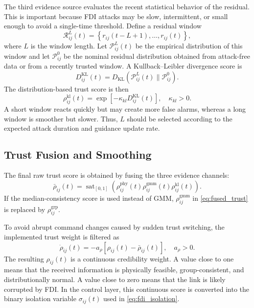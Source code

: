 \documentclass[lettersize,journal]{IEEEtran}
\newcommand{\sat}{\operatorname{sat}}
\begin{document}
The third evidence source evaluates the recent statistical behavior of the residual. This is important because FDI attacks may be slow, intermittent, or small enough to avoid a single-time threshold. Define a residual window
\begin{equation}
    \mathcal{R}_{ij}^{L}(t)
    =
    \left\{
    r_{ij}(t-L+1),\ldots,r_{ij}(t)
    \right\},
    \label{eq:residual_window}
\end{equation}
where $L$ is the window length. Let $\mathcal{P}_{ij}^{L}(t)$ be the empirical distribution of this window and let $\mathcal{P}_{ij}^{0}$ be the nominal residual distribution obtained from attack-free data or from a recently trusted window. A Kullback--Leibler divergence score is
\begin{equation}
    D_{ij}^{\mathrm{KL}}(t)
    =
    D_{\mathrm{KL}}
    \left(
    \mathcal{P}_{ij}^{L}(t)
    \|
    \mathcal{P}_{ij}^{0}
    \right).
    \label{eq:kld_score}
\end{equation}
The distribution-based trust score is then
\begin{equation}
    \rho_{ij}^{\mathrm{kl}}(t)
    =
    \exp\left[-\kappa_{kl}D_{ij}^{\mathrm{KL}}(t)\right],
    \quad \kappa_{kl}>0.
    \label{eq:kld_trust}
\end{equation}
A short window reacts quickly but may create more false alarms, whereas a long window is smoother but slower. Thus, $L$ should be selected according to the expected attack duration and guidance update rate.

\subsection{Trust Fusion and Smoothing}

The final raw trust score is obtained by fusing the three evidence channels:
\begin{equation}
    \bar{\rho}_{ij}(t)
    =
    \sat_{[0,1]}
    \left(
    \rho_{ij}^{\mathrm{phy}}(t)
    \rho_{ij}^{\mathrm{gmm}}(t)
    \rho_{ij}^{\mathrm{kl}}(t)
    \right).
    \label{eq:fused_trust}
\end{equation}
If the median-consistency score is used instead of GMM, $\rho_{ij}^{\mathrm{gmm}}$ in \eqref{eq:fused_trust} is replaced by $\rho_{ij}^{\mathrm{grp}}$.

To avoid abrupt command changes caused by sudden trust switching, the implemented trust weight is filtered as
\begin{equation}
    \dot{\rho}_{ij}(t)
    =
    -a_{\rho}
    \left[
    \rho_{ij}(t)-\bar{\rho}_{ij}(t)
    \right],
    \quad a_{\rho}>0.
    \label{eq:trust_filter}
\end{equation}
The resulting $\rho_{ij}(t)$ is a continuous credibility weight. A value close to one means that the received information is physically feasible, group-consistent, and distributionally normal. A value close to zero means that the link is likely corrupted by FDI. In the control layer, this continuous score is converted into the binary isolation variable $\sigma_{ij}(t)$ used in \eqref{eq:fdi_isolation}.
\end{document}
